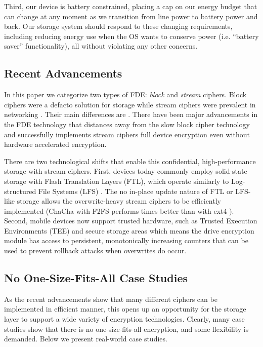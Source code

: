 Third, our device is battery constrained, placing a cap on our energy budget
that can change at any moment as we transition from line power to battery power
and back. Our storage system should respond to these changing requirements,
including reducing energy use when the OS wants to conserve power (i.e.
``battery saver'' functionality), all without violating any other concerns.


\subsection{Recent Advancements}

In this paper we categorize two types of FDE: {\em block} and {\em stream}
ciphers. Block ciphers were a defacto solution for storage while stream ciphers
were prevalent in networking . Their main differences are . There have been major advancements in the FDE
technology that distances away from the slow block cipher technology and
successfully implements stream ciphers full device encryption \cite{Adiantum,
StrongBox} even without hardware accelerated encryption.

There are two technological shifts that enable this confidential,
high-performance storage with stream ciphers. First, devices today commonly
employ solid-state storage with Flash Translation Layers (FTL), which operate
similarly to Log-structured File Systems (LFS) \cite{LFS, F2FS, NILFS}. The no
in-place update nature of FTL or LFS-like storage allows the overwrite-heavy
stream ciphers to be efficiently implemented (\eg ChaCha with F2FS performs \xxx
times better than with ext4 \cite{StrongBox}). Second, mobile devices now
support trusted hardware, such as Trusted Execution Environments (TEE)
\cite{TrustZone, TEE} and secure storage areas \cite{eMMC-standard} which means
the drive encryption module has access to persistent, monotonically increasing
counters that can be used to prevent rollback attacks when overwrites do occur.


\subsection{No One-Size-Fits-All Case Studies}

As the recent advancements show that many different ciphers can be implemented
in efficient manner, this opens up an opportunity for the storage layer to
support a wide variety of encryption technologies. Clearly, many case studies
show that there is no one-size-fits-all encryption, and some flexibility is
demanded. Below we present \numCases real-world case studies.

